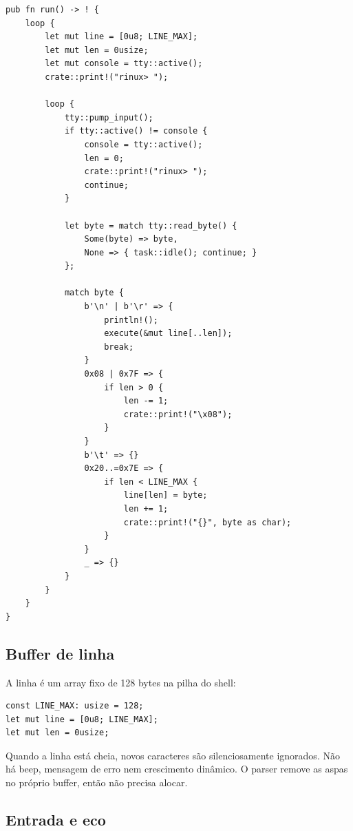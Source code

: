 \begin{lstlisting}[caption={Estrutura do la\c{c}o do shell.},label={lst:shellloop}]
pub fn run() -> ! {
    loop {
        let mut line = [0u8; LINE_MAX];
        let mut len = 0usize;
        let mut console = tty::active();
        crate::print!("rinux> ");

        loop {
            tty::pump_input();
            if tty::active() != console {
                console = tty::active();
                len = 0;
                crate::print!("rinux> ");
                continue;
            }

            let byte = match tty::read_byte() {
                Some(byte) => byte,
                None => { task::idle(); continue; }
            };

            match byte {
                b'\n' | b'\r' => {
                    println!();
                    execute(&mut line[..len]);
                    break;
                }
                0x08 | 0x7F => {
                    if len > 0 {
                        len -= 1;
                        crate::print!("\x08");
                    }
                }
                b'\t' => {}
                0x20..=0x7E => {
                    if len < LINE_MAX {
                        line[len] = byte;
                        len += 1;
                        crate::print!("{}", byte as char);
                    }
                }
                _ => {}
            }
        }
    }
}
\end{lstlisting}

\subsection{Buffer de linha}

A linha \'e um array fixo de 128 bytes na pilha do shell:

\begin{lstlisting}[caption={Buffer de linha.},label={lst:linebuffer}]
const LINE_MAX: usize = 128;
let mut line = [0u8; LINE_MAX];
let mut len = 0usize;
\end{lstlisting}

Quando a linha est\'a cheia, novos caracteres s\~ao silenciosamente
ignorados. N\~ao h\'a beep, mensagem de erro nem crescimento din\^amico. O
parser remove as aspas no pr\'oprio buffer, ent\~ao n\~ao precisa alocar.

\subsection{Entrada e eco}

